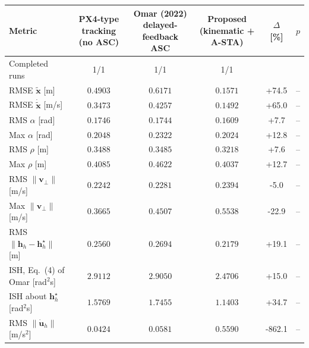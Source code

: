 
\begin{tabular}{lccccc}
\toprule
Metric & PX4-type tracking (no ASC) & Omar (2022) delayed-feedback ASC & Proposed (kinematic + A-STA) & $\Delta$ [\%] & $p$ \\
\midrule
Completed runs & 1/1 & 1/1 & 1/1 & & \\
RMSE $\tilde{\mathbf{x}}$ [m] & $0.4903$ & $0.6171$ & $0.1571$ & +74.5 & -- \\
RMSE $\dot{\tilde{\mathbf{x}}}$ [m/s] & $0.3473$ & $0.4257$ & $0.1492$ & +65.0 & -- \\
RMS $\alpha$ [rad] & $0.1746$ & $0.1744$ & $0.1609$ & +7.7 & -- \\
Max $\alpha$ [rad] & $0.2048$ & $0.2322$ & $0.2024$ & +12.8 & -- \\
RMS $\rho$ [m] & $0.3488$ & $0.3485$ & $0.3218$ & +7.6 & -- \\
Max $\rho$ [m] & $0.4085$ & $0.4622$ & $0.4037$ & +12.7 & -- \\
RMS $\|\mathbf{v}_\perp\|$ [m/s] & $0.2242$ & $0.2281$ & $0.2394$ & -5.0 & -- \\
Max $\|\mathbf{v}_\perp\|$ [m/s] & $0.3665$ & $0.4507$ & $0.5538$ & -22.9 & -- \\
RMS $\|\mathbf{h}_h-\mathbf{h}^\star_h\|$ [m] & $0.2560$ & $0.2694$ & $0.2179$ & +19.1 & -- \\
ISH, Eq.~(4) of Omar [rad$^2$s] & $2.9112$ & $2.9050$ & $2.4706$ & +15.0 & -- \\
ISH about $\mathbf{h}^\star_h$ [rad$^2$s] & $1.5769$ & $1.7455$ & $1.1403$ & +34.7 & -- \\
RMS $\|\dot{\mathbf{u}}_h\|$ [m/s$^2$] & $0.0424$ & $0.0581$ & $0.5590$ & -862.1 & -- \\
\bottomrule
\end{tabular}
